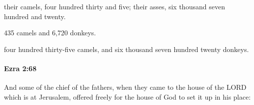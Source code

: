 			\begin{versebox}
					\item[BHS] 
					\item[LXX] 
					\item[ASV] their camels, four hundred thirty and five; their asses, six thousand seven hundred and twenty.
					\item[NIV] 435 camels and 6,720 donkeys.
					\item[NRSV] four hundred thirty-five camels, and six thousand seven hundred twenty donkeys.
			\end{versebox}

		\paragraph{Ezra 2:68} %
			\label{EZRA-2-68}

			And some of the chief of the fathers, when they came to the house of the LORD which is at Jerusalem, offered freely for the house of God to set it up in his place:

